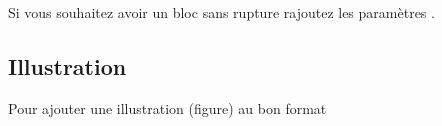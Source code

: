 Si vous souhaitez avoir un bloc sans rupture rajoutez les paramètres
.

\subsection{Illustration}

Pour ajouter une illustration (figure) au bon format

